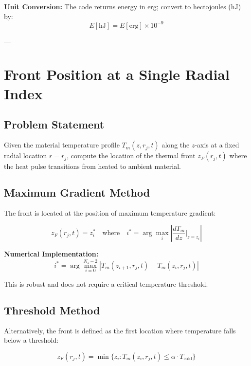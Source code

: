\documentclass[11pt]{article}
\begin{document}
\noindent \textbf{Unit Conversion:} The code returns energy in erg; convert to hectojoules (hJ) by:
\begin{equation}
E[\text{hJ}] = E[\text{erg}] \times 10^{-9}
\end{equation}

---

\section{Front Position at a Single Radial Index}

\subsection{Problem Statement}

Given the material temperature profile $T_m(z,r_j,t)$ along the $z$-axis at a fixed radial location $r = r_j$, compute the location of the thermal front $z_F(r_j,t)$ where the heat pulse transitions from heated to ambient material.

\subsection{Maximum Gradient Method}

The front is located at the position of maximum temperature gradient:

\begin{equation}
z_F(r_j,t) = z_i^* \quad \text{where} \quad i^* = \arg\max_i \left| \frac{dT_m}{dz}\bigg|_{z=z_i} \right|
\end{equation}

\noindent \textbf{Numerical Implementation:}
\begin{equation}
i^* = \arg\max_{i=0}^{N_z-2} \left| T_m(z_{i+1},r_j,t) - T_m(z_i,r_j,t) \right|
\end{equation}

\noindent This is robust and does not require a critical temperature threshold.

\subsection{Threshold Method}

Alternatively, the front is defined as the first location where temperature falls below a threshold:

\begin{equation}
z_F(r_j,t) = \min\{z_i : T_m(z_i,r_j,t) \le \alpha \cdot T_{\text{cold}}\}
\end{equation}
\end{document}
